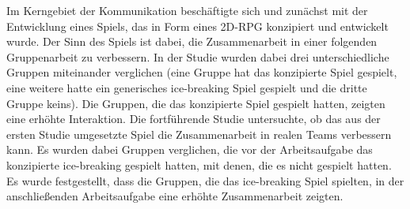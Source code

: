 Im Kerngebiet der Kommunikation beschäftigte sich \cite{nasir_cooperative_2013} und \cite{nasir_effect_2015} zunächst mit der Entwicklung eines  Spiels, das in Form eines 2D-\ac{RPG} konzipiert und entwickelt wurde. Der Sinn des Spiels ist dabei, die Zusammenarbeit in einer folgenden Gruppenarbeit zu verbessern. In der Studie wurden dabei drei unterschiedliche Gruppen miteinander verglichen (eine Gruppe hat das konzipierte Spiel gespielt, eine weitere hatte ein generisches ice-breaking Spiel gespielt und die dritte Gruppe keins). Die Gruppen, die das konzipierte Spiel gespielt hatten, zeigten eine erhöhte Interaktion. Die fortführende Studie untersuchte, ob das aus der ersten Studie umgesetzte Spiel die Zusammenarbeit in realen Teams verbessern kann. Es wurden dabei Gruppen verglichen, die vor der Arbeitsaufgabe das konzipierte ice-breaking gespielt hatten, mit denen, die es nicht gespielt hatten. Es wurde festgestellt, dass die Gruppen, die das ice-breaking Spiel spielten, in der anschließenden Arbeitsaufgabe eine erhöhte Zusammenarbeit zeigten.







